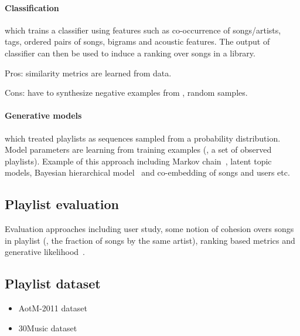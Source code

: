 \paragraph{Classification} which trains a classifier using features such as co-occurrence of songs/artists, tags, 
ordered pairs of songs, bigrams and acoustic features. The output of classifier can then be used to induce a ranking over songs in a library.
\begin{description}
\item Pros: similarity metrics are learned from data.
\item Cons: have to synthesize negative examples from \eg, random samples.
\end{description}


\paragraph{Generative models} which treated playlists as sequences sampled from a probability distribution. 
Model parameters are learning from training examples (\ie, a set of observed playlists).
Example of this approach including Markov chain~\cite{chen2012playlist}, latent topic models, Bayesian hierarchical model~\cite{bengroove2017} 
and co-embedding of songs and users etc.


\subsection{Playlist evaluation}
Evaluation approaches including user study, some notion of cohesion overs songs in playlist (\eg, the fraction of songs by the same artist), 
ranking based metrics and generative likelihood~\cite{mcfee2011natural}.

\subsection{Playlist dataset}
\begin{itemize}
\item AotM-2011 dataset~\cite{mcfee2012hypergraph}
\item 30Music dataset~\cite{turrin201530music}
\end{itemize}
